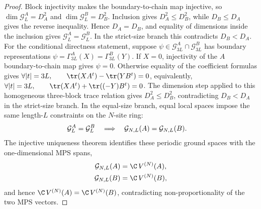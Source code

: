 \begin{proof}
    \leanok
    Block injectivity makes the boundary-to-chain map injective, so
    $\dim\mathcal G_L^A=D_A^2$ and $\dim\mathcal G_L^B=D_B^2$.
    Inclusion gives $D_A^2\le D_B^2$, while $D_B\le D_A$ gives the reverse
    inequality. Hence $D_A=D_B$, and equality of dimensions inside the
    inclusion gives $\mathcal G_L^A=\mathcal G_L^B$. In the strict-size branch
    this contradicts $D_B<D_A$. For the conditional directness statement,
    suppose $\psi\in\mathcal G_{3L}^A\cap\mathcal G_{3L}^B$ has boundary
    representations
    $\psi = \Gamma_{3L}^A(X) = \Gamma_{3L}^B(Y)$.
    If $X=0$, injectivity of the $A$ boundary-to-chain map gives $\psi=0$.
    Otherwise equality of the coefficient formulas gives
    $\forall |t|=3L,\qquad \tr(XA^t)-\tr(YB^t) =0$,
    equivalently,
    $\forall |t|=3L,\qquad \tr(XA^t)+\tr((-Y)B^t) =0$.
    The dimension step applied to this homogeneous three-block trace relation
    gives $D_A^2\le D_B^2$, contradicting $D_B<D_A$ in the strict-size branch.
    In the equal-size branch, equal local spaces impose the same length-$L$
    constraints on the $N$-site ring:
    \begin{align}
        \mathcal G_L^A=\mathcal G_L^B
        \quad\Longrightarrow\quad
        \mathcal G_{N,L}(A)
         & =
        \mathcal G_{N,L}(B).
        \notag
    \end{align}
    The injective uniqueness theorem identifies these periodic ground spaces
    with the one-dimensional MPS spans,
    \begin{align}
        \mathcal G_{N,L}(A) & = \C\,V^{(N)}(A),
        \notag                                  \\
        \mathcal G_{N,L}(B) & = \C\,V^{(N)}(B),
        \notag
    \end{align}
    and hence $\C\,V^{(N)}(A)=\C\,V^{(N)}(B)$, contradicting
    non-proportionality of the two MPS vectors.
\end{proof}

